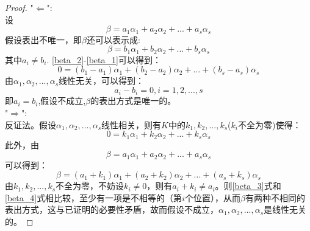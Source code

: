 \documentclass[blue,normal,cn]{elegantnote}
\begin{document}
\begin{proof}
    "$\Leftarrow$":\\
    设
    \begin{equation}
    β=a_1α_1+a_2α_2+...+a_sα_s  \label{beta_1}
    \end{equation}
    假设表出不唯一，即$β$还可以表示成:
    \begin{equation}
    β=b_1 α_1+b_2 α_2+...+b_s α_s  \label{beta_2}
    \end{equation}
    其中$a_i ≠ b_i$.
    \eqref{beta_2}-\eqref{beta_1}可以得到：
    \begin{equation*}
        0=(b_1-a_1)α_1+(b_2-a_2)α_2+...+(b_s-a_s)α_s 
    \end{equation*}
    由$α_1,α_2,...,α_s$线性无关，可以得到：
    \begin{equation*}
        a_i-b_i=0,i=1,2,...,s
    \end{equation*}
    即$a_i=b_i$,假设不成立,$β$的表出方式是唯一的。\\
    "$\Rightarrow$":\\
    反证法。假设$α_1,α_2,...,α_s$线性相关，则有$K$中的$k_1,k_2,...,k_s$($k_i$不全为零)使得：
    \begin{equation*}
        0=k_1α_1+k_2α_2+...+k_sα_s 
    \end{equation*}
    此外，由
    \begin{equation}
    β=a_1α_1+a_2α_2+...+a_sα_s  \label{beta_3}
    \end{equation}
    可以得到：
    \begin{equation}
        β=(a_1+k_1)α_1+(a_2+k_2)α_2+...+(a_s+k_s)α_s  \label{beta_4}
    \end{equation}
    由$k_1,k_2,...,k_s$不全为零，不妨设$k_i ≠ 0$，则有$a_i+k_i ≠ a_i$。则\eqref{beta_3}式和\eqref{beta_4}式相比较，至少有一项是不相等的（第$i$个位置），从而$β$有两种不相同的表出方式，这与已证明的必要性矛盾，故而假设不成立，$α_1,α_2,...,α_s$是线性无关的。

\end{proof}
\end{document}
